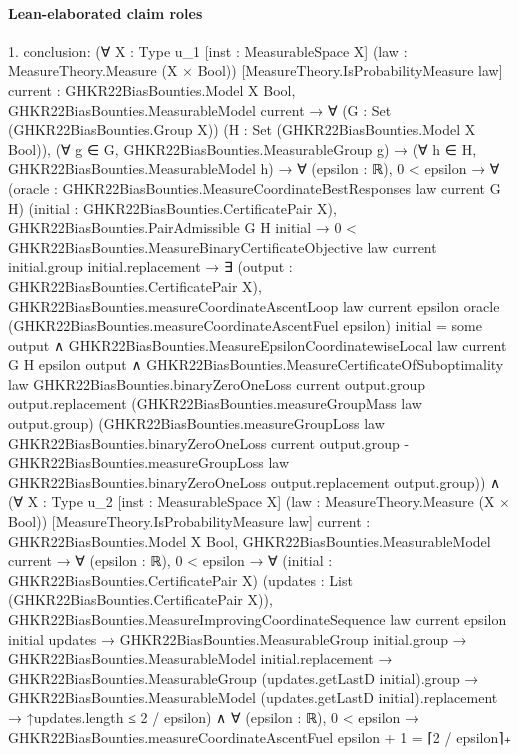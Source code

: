\documentclass[10pt]{article}
\begin{document}
\paragraph{Lean-elaborated claim roles}\begin{ReviewVerbatim}
1. conclusion: (∀ {X : Type u_1} [inst : MeasurableSpace X] (law : MeasureTheory.Measure (X × Bool))
    [MeasureTheory.IsProbabilityMeasure law] {current : GHKR22BiasBounties.Model X Bool},
    GHKR22BiasBounties.MeasurableModel current →
      ∀ (G : Set (GHKR22BiasBounties.Group X)) (H : Set (GHKR22BiasBounties.Model X Bool)),
        (∀ g ∈ G, GHKR22BiasBounties.MeasurableGroup g) →
          (∀ h ∈ H, GHKR22BiasBounties.MeasurableModel h) →
            ∀ (epsilon : ℝ),
              0 < epsilon →
                ∀ (oracle : GHKR22BiasBounties.MeasureCoordinateBestResponses law current G H)
                  (initial : GHKR22BiasBounties.CertificatePair X),
                  GHKR22BiasBounties.PairAdmissible G H initial →
                    0 <
                        GHKR22BiasBounties.MeasureBinaryCertificateObjective law current initial.group
                          initial.replacement →
                      ∃ (output : GHKR22BiasBounties.CertificatePair X),
                        GHKR22BiasBounties.measureCoordinateAscentLoop law current epsilon oracle
                              (GHKR22BiasBounties.measureCoordinateAscentFuel epsilon) initial =
                            some output ∧
                          GHKR22BiasBounties.MeasureEpsilonCoordinatewiseLocal law current G H epsilon output ∧
                            GHKR22BiasBounties.MeasureCertificateOfSuboptimality law
                              GHKR22BiasBounties.binaryZeroOneLoss current output.group output.replacement
                              (GHKR22BiasBounties.measureGroupMass law output.group)
                              (GHKR22BiasBounties.measureGroupLoss law GHKR22BiasBounties.binaryZeroOneLoss current
                                  output.group -
                                GHKR22BiasBounties.measureGroupLoss law GHKR22BiasBounties.binaryZeroOneLoss
                                  output.replacement output.group)) ∧
  (∀ {X : Type u_2} [inst : MeasurableSpace X] (law : MeasureTheory.Measure (X × Bool))
      [MeasureTheory.IsProbabilityMeasure law] {current : GHKR22BiasBounties.Model X Bool},
      GHKR22BiasBounties.MeasurableModel current →
        ∀ (epsilon : ℝ),
          0 < epsilon →
            ∀ (initial : GHKR22BiasBounties.CertificatePair X) (updates : List (GHKR22BiasBounties.CertificatePair X)),
              GHKR22BiasBounties.MeasureImprovingCoordinateSequence law current epsilon initial updates →
                GHKR22BiasBounties.MeasurableGroup initial.group →
                  GHKR22BiasBounties.MeasurableModel initial.replacement →
                    GHKR22BiasBounties.MeasurableGroup (updates.getLastD initial).group →
                      GHKR22BiasBounties.MeasurableModel (updates.getLastD initial).replacement →
                        ↑updates.length ≤ 2 / epsilon) ∧
    ∀ (epsilon : ℝ), 0 < epsilon → GHKR22BiasBounties.measureCoordinateAscentFuel epsilon + 1 = ⌈2 / epsilon⌉₊
\end{ReviewVerbatim}
\end{document}
